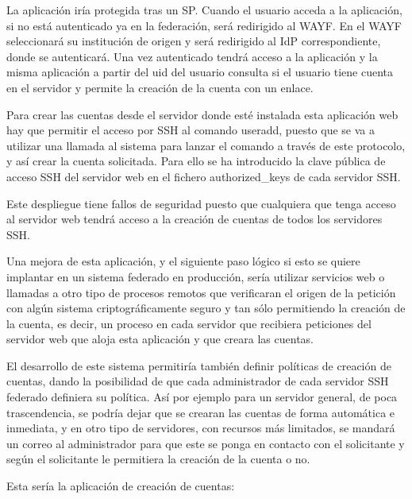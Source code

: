     La aplicación iría protegida tras un SP. Cuando
    el usuario acceda a la aplicación, si no está autenticado ya en la
    federación, será redirigido al WAYF. En el WAYF seleccionará su
    institución de origen y será redirigido al IdP correspondiente, donde
    se autenticará. Una vez autenticado tendrá acceso a la aplicación y la
    misma aplicación a partir del uid del usuario consulta si el usuario
    tiene cuenta en el servidor y permite la creación de la cuenta con un
    enlace.

    Para crear las cuentas desde el servidor donde esté instalada esta
    aplicación web hay que permitir el acceso por SSH al comando useradd,
    puesto que se va a utilizar una llamada al sistema para lanzar el
    comando a través de este protocolo, y así crear la cuenta solicitada.
    Para ello se ha introducido la clave pública de acceso SSH del
    servidor web en el fichero authorized\_keys de cada servidor SSH.

    Este despliegue tiene fallos de seguridad puesto que cualquiera que
    tenga acceso al servidor web tendrá acceso a la creación de cuentas de
    todos los servidores SSH.

    Una mejora de esta aplicación, y el siguiente paso lógico si esto se
    quiere implantar en un sistema federado en producción, sería utilizar
    servicios web o llamadas a otro tipo de procesos remotos que
    verificaran el origen de la petición con algún sistema
    criptográficamente seguro y tan sólo permitiendo la creación de la
    cuenta, es decir, un proceso en cada servidor que recibiera peticiones
    del servidor web que aloja esta aplicación y que creara las cuentas.

    El desarrollo de este sistema permitiría también definir políticas de
    creación de cuentas, dando la posibilidad de que cada administrador de
    cada servidor SSH federado definiera su política. Así por ejemplo para
    un servidor general, de poca trascendencia, se podría dejar que se
    crearan las cuentas de forma automática e inmediata, y en otro tipo de
    servidores, con recursos más limitados, se mandará un correo al
    administrador para que este se ponga en contacto con el solicitante y
    según el solicitante le permitiera la creación de la cuenta o no.

    Esta sería la aplicación de creación de cuentas:
     
